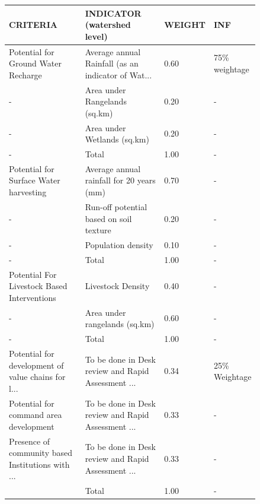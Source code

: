 \begin{longtable}{| p{0.35\linewidth} | p{0.35\linewidth} | p{0.07\linewidth} | p{0.07\linewidth} | }
    \hline
    CRITERIA                                           & INDICATOR (watershed level)                        & WEIGHT & INF\\
    \hline
    Potential for Ground Water Recharge                & Average annual Rainfall (as an indicator of Wat... & 0.60 & 75\% weightage \\
    -                                                  & Area under Rangelands (sq.km)                      & 0.20                & -                             \\
    -                                                  & Area under Wetlands (sq.km)                        & 0.20                & -                             \\
    -                                                  & Total                                              & 1.00                & -                             \\
    Potential for Surface Water harvesting             & Average annual rainfall for 20 years (mm) & 0.70 & -\\
    -                                                  & Run-off potential based on soil texture            & 0.20                & -                             \\
    -                                                  & Population density                                 & 0.10                & -                             \\
    -                                                  & Total                                              & 1.00                & -                             \\
    Potential For Livestock Based Interventions        & Livestock Density                                  & 0.40                & -                             \\
    -                                                  & Area under rangelands (sq.km)                      & 0.60                & -                             \\
  \hline
    -                                                  & Total                                              & 1.00                & -                             \\
    \hline
    Potential for development of value chains for l... & To be done in Desk review and Rapid Assessment ... & 0.34 & 25\% Weightage \\
    Potential for command area development             & To be done in Desk review and Rapid Assessment ... & 0.33 & -\\
    Presence of community based Institutions with ...  & To be done in Desk review and Rapid Assessment ... & 0.33 & -\\
\hline
  &                                              Total &                 1.00 &                           -\\
\hline
\end{longtable}

